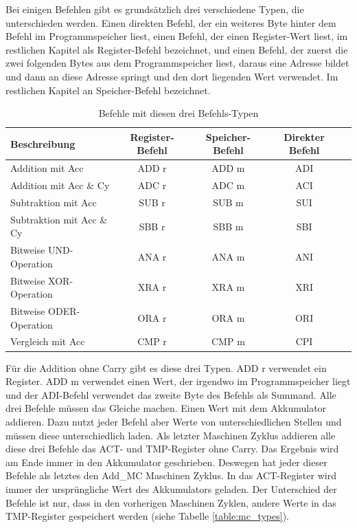 \documentclass[12pt]{article}
\newcommand{\imgSpaceBefore}{\vspace{10pt}}
\begin{document}
\noindent
Bei einigen Befehlen gibt es grundsätzlich drei verschiedene Typen, die unterschieden werden. Einen direkten Befehl, der ein weiteres Byte hinter dem Befehl im Programmspeicher liest, einen Befehl, der einen Register-Wert liest, im restlichen Kapitel als Register-Befehl bezeichnet, und einen Befehl, der zuerst die zwei folgenden Bytes aus dem Programmspeicher liest, daraus eine Adresse bildet und dann an diese Adresse springt und den dort liegenden Wert verwendet. Im restlichen Kapitel an Speicher-Befehl bezeichnet.

\imgSpaceBefore
\begin{table}[H]
\centering
\begin{tabular}{|l|c|c|c|c| } 
 \hline
 Beschreibung & Register-Befehl & Speicher-Befehl & Direkter Befehl \\
 \hline 
 Addition mit Acc & ADD r & ADD m & ADI \\ 
 Addition mit Acc \& Cy & ADC r & ADC m & ACI \\ 
 Subtraktion mit Acc & SUB r & SUB m & SUI \\ 
 Subtraktion mit Acc \& Cy & SBB r & SBB m & SBI \\ 
 Bitweise UND-Operation & ANA r & ANA m & ANI \\ 
 Bitweise XOR-Operation & XRA r & XRA m & XRI \\ 
 Bitweise ODER-Operation & ORA r & ORA m & ORI \\ 
 Vergleich mit Acc & CMP r & CMP m & CPI \\ 
 \hline
\end{tabular}
\caption{Befehle mit diesen drei Befehls-Typen}
\label{table:instr_types}
\end{table}

\noindent
Für die Addition ohne Carry gibt es diese drei Typen. ADD r verwendet ein Register. ADD m verwendet einen Wert, der irgendwo im Programmspeicher liegt und der ADI-Befehl verwendet das zweite Byte des Befehls als Summand. Alle drei Befehle müssen das Gleiche machen. Einen Wert mit dem Akkumulator addieren. Dazu nutzt jeder Befehl aber Werte von unterschiedlichen Stellen und müssen diese unterschiedlich laden. 
Als letzter Maschinen Zyklus addieren alle diese drei Befehle das ACT- und TMP-Register ohne Carry. Das Ergebnis wird am Ende immer in den Akkumulator geschrieben. Deswegen hat jeder dieser Befehle als letztes den Add\_MC Maschinen Zyklus. 
In das ACT-Register wird immer der ursprüngliche Wert des Akkumulators geladen. Der Unterschied der Befehle ist nur, dass in den vorherigen Maschinen Zyklen, andere Werte in das TMP-Register gespeichert werden (siehe Tabelle \ref{table:mc_types}). 
\\
\end{document}
